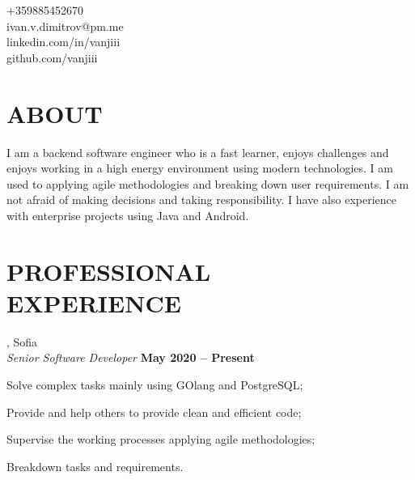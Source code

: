 \documentclass[margin,line]{resume}
\begin{document}
{
    \hfill +359885452670		\vspace{0mm}\\\vspace{0mm}%
    \hfill ivan.v.dimitrov@pm.me        \vspace{0mm}\\\vspace{0mm}%
    \hfill linkedin.com/in/vanjiii      \vspace{0mm}\\\vspace{0mm}%
    \hfill github.com/vanjiii		\vspace{0mm}\\\vspace{-10mm}%
}

\begin{resume}
\vspace{1mm}

\section{\mysidestyle\textbf{\large{A}\small{BOUT}}}

    I am a backend software engineer who is a fast learner, enjoys
    challenges and enjoys working in a high energy environment using
    modern technologies. I am used to applying agile methodologies and
    breaking down user requirements. I am not afraid of making
    decisions and taking responsibility. I have also experience with
    enterprise projects using Java and Android.

\sectionline%

    \section{\mysidestyle\textbf{\large{P}\small{ROFESSIONAL\\EXPERIENCE}}}

    \textbf{}, Sofia \vspace{2mm}\\\vspace{1mm}%
    \textsl{Senior Software Developer} \hfill \textbf{May 2020 {--} Present}\\
    \begin{list2}
        \item Solve complex tasks mainly using GOlang and PostgreSQL;\@
        \item Provide and help others to provide clean and efficient code;
	\item Supervise the working processes applying agile methodologies;
        \item Breakdown tasks and requirements.
    \end{list2}


\end{resume}
\end{document}

